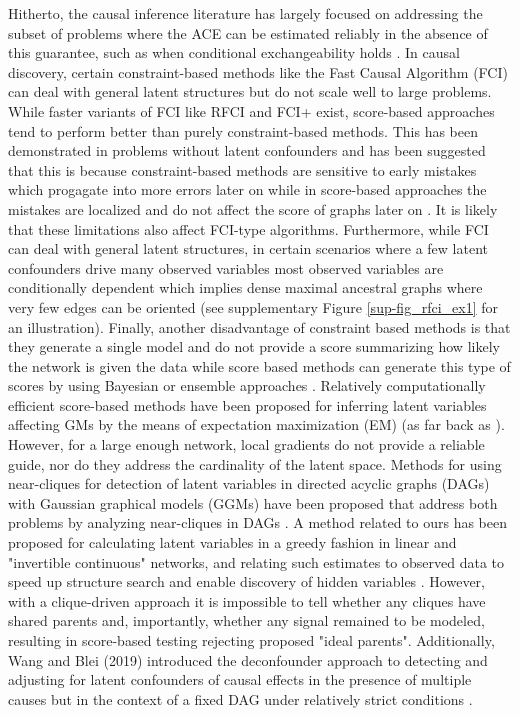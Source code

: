 \documentclass[letterpaper]{article}
\begin{document}
Hitherto, the causal inference literature has largely focused on addressing the subset of problems where the ACE can be estimated reliably in the absence of this guarantee, such as when conditional exchangeability holds \cite{hernan_estimating_2006}.  In causal discovery, certain constraint-based methods like the Fast
Causal Algorithm (FCI) \cite{spirtesCausalInferencePresence1995} can
deal with general latent structures but do not scale well to large
problems. While faster variants of FCI like RFCI \cite{colombo_learning_2012}
and  FCI+ \cite{claassenLearningSparseCausal2013} exist, score-based
approaches tend to perform better than purely constraint-based methods. This
has been demonstrated in problems without latent confounders
\cite{nandy2018high} and has been suggested that this is because
constraint-based methods are sensitive to early mistakes which
progagate into more errors later on while in score-based approaches
the mistakes are localized and do not affect the score of graphs later
on \cite{bernstein2020ordering}. It is likely that these limitations also
affect FCI-type algorithms. Furthermore, while FCI can deal with
general latent structures, in certain scenarios where a few latent confounders
drive  many observed variables  most observed variables are
conditionally dependent which implies dense maximal ancestral graphs
where very few edges can be oriented
\cite{frotRobustCausalStructure2017} (see supplementary Figure \ref{sup-fig_rfci_ex1} for
an illustration). Finally, another disadvantage of
constraint based methods is that they generate a single model and do
not provide a score summarizing how likely the network is given the
data while score based methods can generate this type of scores by using Bayesian or ensemble approaches \cite{jabbariDiscoveryCausalModels2017}. Relatively computationally efficient score-based methods have been proposed for inferring latent variables affecting GMs by the means of expectation maximization (EM) (as far back as \cite{friedman1997learning,friedman1998bayesian}).  However, for a large enough network, local gradients do not provide a reliable guide, nor do they address the cardinality of the latent space.  Methods for using near-cliques for detection of latent variables in directed acyclic graphs (DAGs) with Gaussian graphical models (GGMs) have been proposed that address both problems by analyzing near-cliques in DAGs \cite{elidan_discovering_2001,silva_learning_2006}.  A method related to ours has been proposed for calculating latent variables in a greedy fashion in linear and "invertible continuous" networks, and relating such estimates to observed data to speed up structure search and enable discovery of hidden variables \cite{elidan_ideal_2007}. However, with a clique-driven approach it is impossible to tell whether any cliques have shared parents and, importantly, whether any signal remained to be modeled, resulting in score-based testing rejecting proposed "ideal parents". Additionally, Wang and Blei (2019) introduced the deconfounder approach to detecting and adjusting for latent confounders of causal effects in the presence of multiple causes but in the context of a fixed DAG under relatively strict conditions \cite{wang_deconfounder_2019,wangMultipleCausesCausal2019}. 
\end{document}
